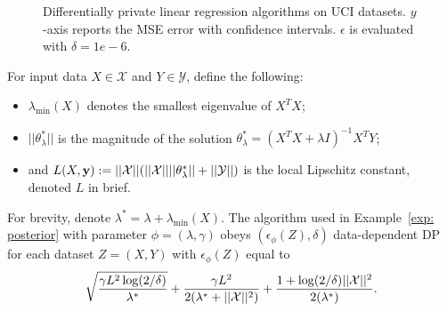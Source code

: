 \begin{figure*}[t]
	\centering	
	\caption{Differentially private linear regression algorithms on UCI datasets. $y$-axis reports the MSE error with confidence intervals. $\epsilon$ is evaluated with $\delta = 1e-6$. }
	\label{fig:selection}%
\end{figure*}



\begin{theorem}\label{thm: per}
For input data $X \in \mathcal{X}$ and $Y \in \mathcal{Y}$, define the following:
\begin{itemize}
    \item $\lambda_{\min}(X)$ denotes the smallest eigenvalue of $X^TX$; %
    \item $||\theta_\lambda^*||$ is the magnitude of the solution $\theta_\lambda^* = (X^TX +\lambda I )^{-1}X^T Y$;%
    \item and $L(X, \mathbf{y}):=||\mathcal{X}||(||\mathcal{X}||||\theta_\lambda^*||+||\mathcal{Y}||)$ is the local Lipschitz constant, denoted $L$ in brief.%
\end{itemize}
For brevity, denote $\lambda^* = \lambda + \lambda_{\min}(X)$.
The algorithm used in Example~\ref{exp: posterior} with  parameter $\phi = (\lambda, \gamma)$ obeys $(\epsilon_{\phi}(Z), \delta)$ data-dependent DP for each dataset $ Z = (X, Y)$  with $\epsilon_{\phi}(Z)$ equal to
\[\sqrt{\frac{\gamma L^2 \log(2/\delta)}{\lambda^*}} + \frac{\gamma L^2}{2(\lambda^*  +||\mathcal{X}||^2)}+ \frac{1 + \log(2/\delta)||\mathcal{X}||^2}{2(\lambda^*)}.
\]
\end{theorem}

